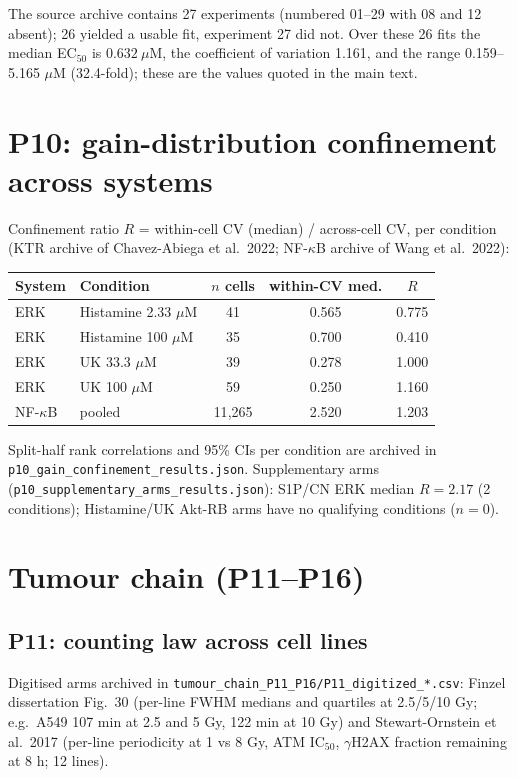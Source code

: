 \documentclass[11pt]{article}
\begin{document}
The source archive contains 27 experiments (numbered 01--29 with 08 and 12 absent); 26 yielded a usable fit, experiment 27 did not. Over these 26 fits the median EC$_{50}$ is $0.632\ \mu$M, the coefficient of variation 1.161, and the range 0.159--5.165 $\mu$M (32.4-fold); these are the values quoted in the main text.

\section{P10: gain-distribution confinement across systems}

Confinement ratio $R$ = within-cell CV (median) / across-cell CV,
per condition (KTR archive of Chavez-Abiega et al.\ 2022; NF-$\kappa$B
archive of Wang et al.\ 2022):

\begin{table}[h]
\centering\small
\begin{tabular}{llccc}
\toprule
System & Condition & $n$ cells & within-CV med. & $R$ \\
\midrule
ERK & Histamine 2.33 $\mu$M & 41 & 0.565 & 0.775 \\
ERK & Histamine 100 $\mu$M & 35 & 0.700 & 0.410 \\
ERK & UK 33.3 $\mu$M & 39 & 0.278 & 1.000 \\
ERK & UK 100 $\mu$M & 59 & 0.250 & 1.160 \\
NF-$\kappa$B & pooled & 11{,}265 & 2.520 & 1.203 \\
\bottomrule
\end{tabular}
\end{table}

Split-half rank correlations and 95\% CIs per condition are archived in
\texttt{p10\_gain\_confinement\_results.json}. Supplementary arms
(\texttt{p10\_supplementary\_arms\_\allowbreak results.json}): S1P/CN ERK median
$R=2.17$ (2 conditions); Histamine/UK Akt-RB arms have no qualifying
conditions ($n=0$).

\section{Tumour chain (P11--P16)}

\subsection{P11: counting law across cell lines}

Digitised arms archived in
\texttt{tumour\_chain\_P11\_P16/P11\_digitized\_*.csv}: Finzel
dissertation Fig.~30 (per-line FWHM medians and quartiles at 2.5/5/10
Gy; e.g.\ A549 107 min at 2.5 and 5 Gy, 122 min at 10 Gy) and
Stewart-Ornstein et al.\ 2017 (per-line periodicity at 1 vs 8 Gy, ATM
IC$_{50}$, $\gamma$H2AX fraction remaining at 8 h; 12 lines).
\end{document}
